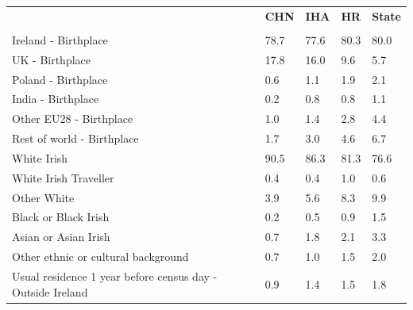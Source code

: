 \documentclass{article}
\begin{document}
\pagebreak
\begin{table}[h]	
\centering
		\begin{tabular}{KTTTT}
  \hline
& \textbf{CHN} & \textbf{IHA} & \textbf{HR}& \textbf{State}\\ 
  \hline
    \\ 
    \hline
Ireland - Birthplace & 78.7& 77.6& 80.3& 80.0\\
UK - Birthplace & 17.8& 16.0&  9.6&  5.7\\
Poland - Birthplace & 0.6& 1.1& 1.9& 2.1\\
India - Birthplace & 0.2& 0.8& 0.8& 1.1\\
Other EU28 - Birthplace & 1.0& 1.4& 2.8& 4.4\\
Rest of world - Birthplace & 1.7& 3.0& 4.6& 6.7\\
    \hline
White Irish & 90.5& 86.3& 81.3& 76.6\\
White Irish Traveller & 0.4& 0.4& 1.0& 0.6\\
Other White & 3.9& 5.6& 8.3& 9.9\\
Black or Black Irish & 0.2& 0.5& 0.9& 1.5\\
Asian or Asian Irish & 0.7& 1.8& 2.1& 3.3\\
Other ethnic or cultural background & 0.7& 1.0& 1.5& 2.0\\
    \hline
Usual residence 1 year before census day - Outside Ireland & 0.9& 1.4& 1.5& 1.8\\


\end{tabular}
\end{table}
\end{document}
